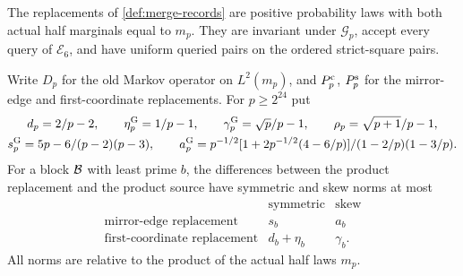 \begin{lemma}\label{lem:merge-repair}
The replacements of \cref{def:merge-records} are positive probability laws
with both actual half marginals equal to $m_p$. They are invariant under
$\mathcal G_p$, accept every query of $\mathcal E_6$, and have uniform
queried pairs on the ordered strict-square pairs.

Write $D_p$ for the old Markov operator on $L^2(m_p)$, and $P_p^{\rm c}$,
$P_p^{\rm s}$ for the mirror-edge and first-coordinate replacements.
For $p\ge2^{24}$ put
\begin{gather*}
 d_p=\frac2{p-2},\qquad \eta^{\rm G}_p=\frac1{p-1},\qquad
 \gamma^{\rm G}_p=\frac{\sqrt p}{p-1},\qquad
 \rho_p=\frac{\sqrt{p+1}}{p-1},\\
 s^{\rm G}_p=\frac{5p-6}{(p-2)(p-3)},\qquad
 a^{\rm G}_p=\frac{p^{-1/2}[1+2p^{-1/2}(4-6/p)]}{(1-2/p)(1-3/p)}.
\end{gather*}
For a block $\Blk$ with least prime $b$, the differences between the product
replacement and the product source have symmetric and skew norms at most
\[
 \begin{array}{c|cc}
 &\text{symmetric}&\text{skew}\\ \hline
 \text{mirror-edge replacement}&s_b&a_b\\
 \text{first-coordinate replacement}&d_b+\eta_b&\gamma_b.
 \end{array}
\]
All norms are relative to the product of the actual half laws $m_p$.
\end{lemma}

